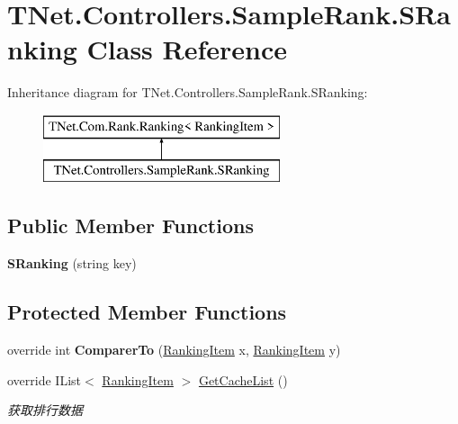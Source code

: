 \hypertarget{class_t_net_1_1_controllers_1_1_sample_rank_1_1_s_ranking}{}\section{T\+Net.\+Controllers.\+Sample\+Rank.\+S\+Ranking Class Reference}
\label{class_t_net_1_1_controllers_1_1_sample_rank_1_1_s_ranking}
Inheritance diagram for T\+Net.\+Controllers.\+Sample\+Rank.\+S\+Ranking\+:\begin{figure}[H]
\begin{center}
\leavevmode
\includegraphics[height=2.000000cm]{class_t_net_1_1_controllers_1_1_sample_rank_1_1_s_ranking}
\end{center}
\end{figure}
\subsection*{Public Member Functions}
\begin{DoxyCompactItemize}
\item 
\mbox{\label{class_t_net_1_1_controllers_1_1_sample_rank_1_1_s_ranking_a1cf00452c4e1e70d1fe2a0cb0b835eed}} 
{\bfseries S\+Ranking} (string key)
\end{DoxyCompactItemize}
\subsection*{Protected Member Functions}
\begin{DoxyCompactItemize}
\item 
\mbox{\label{class_t_net_1_1_controllers_1_1_sample_rank_1_1_s_ranking_abde10a92847b0488e40a0189ad49602b}} 
override int {\bfseries Comparer\+To} (\mbox{\hyperlink{class_t_net_1_1_com_1_1_model_1_1_ranking_item}{Ranking\+Item}} x, \mbox{\hyperlink{class_t_net_1_1_com_1_1_model_1_1_ranking_item}{Ranking\+Item}} y)
\item 
override I\+List$<$ \mbox{\hyperlink{class_t_net_1_1_com_1_1_model_1_1_ranking_item}{Ranking\+Item}} $>$ \mbox{\hyperlink{class_t_net_1_1_controllers_1_1_sample_rank_1_1_s_ranking_a91a2f72ebdb7fef162dd51f25939e3db}{Get\+Cache\+List}} ()
\begin{DoxyCompactList}\small\item\em 获取排行数据 \end{DoxyCompactList}\end{DoxyCompactItemize}
